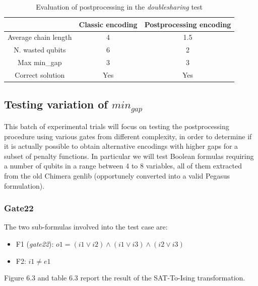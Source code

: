 \begin{table}[]
\centering
\begin{tabular}{|c|c|c|}
\hline
 & \cellcolor[HTML]{FFFE65}Classic encoding & \cellcolor[HTML]{FFFE65}Postprocessing encoding \\ \hline
\cellcolor[HTML]{00D2CB}Average chain length & 4 & 1.5 \\ \hline
\cellcolor[HTML]{00D2CB}N. wasted qubits & 6 & 2 \\ \hline
\cellcolor[HTML]{00D2CB}Max min\_gap & 3 & 3 \\ \hline
\rowcolor[HTML]{67FD9A} 
\cellcolor[HTML]{00D2CB}Correct solution     & Yes                                      & Yes                                             \\ \hline
\end{tabular}
\caption{Evaluation of postprocessing in the \textit{doublesharing} test}
\end{table}

\subsection{Testing variation of $min_{gap}$}

This batch of experimental trials will focus on testing the postprocessing procedure using various gates from different complexity, in order to determine if it is actually possible to obtain alternative encodings with higher gaps for a subset of penalty functions. In particular we will test Boolean formulas requiring a number of qubits in a range between 4 to 8 variables, all of them extracted from the old Chimera genlib (opportunely converted into a valid Pegasus formulation). \\

\newpage 
\subsubsection{Gate22}

The two sub-formulas involved into the test case are:

\begin{itemize}
    \item F1 (\textit{gate22}): $o1 = (i1 \vee i2) \wedge (i1 \vee i3) \wedge (i2 \vee i3)$
    \item F2: $i1 \neq e1$
\end{itemize}

Figure 6.3 and table 6.3 report the result of the SAT-To-Ising transformation.

